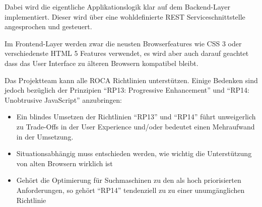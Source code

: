 Dabei wird die eigentliche Applikationslogik klar auf dem Backend-Layer implementiert. Dieser wird über eine wohldefinierte REST Serviceschnittstelle  angesprochen und gesteuert.

Im Frontend-Layer werden zwar die neusten Browserfeatures wie CSS 3 oder verschiedenste HTML 5 Features verwendet, es wird aber auch darauf geachtet dass das User Interface zu älteren Browsern kompatibel bleibt.

Das Projektteam kann alle ROCA Richtlinien unterstützen. Einige Bedenken sind jedoch bezüglich der Prinzipien ``RP13: Progressive Enhancement'' und ``RP14: Unobtrusive JavaScript'' anzubringen:

\begin{itemize}
	\item Ein blindes Umsetzen der Richtlinien ``RP13'' und ``RP14'' führt unweigerlich zu Trade-Offs in der User Experience und/oder bedeutet einen Mehraufwand in der Umsetzung.
	\item Situationsabhängig muss entschieden werden, wie wichtig die Unterstützung von alten Browsern wirklich ist
	\item Gehört die Optimierung für Suchmaschinen zu den als hoch priorisierten Anforderungen, so gehört ``RP14'' tendenziell zu zu einer unumgänglichen Richtlinie
\end{itemize}